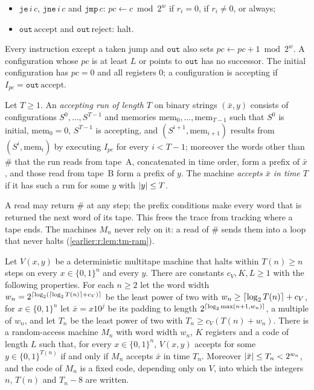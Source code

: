 \begin{definition}
\begin{itemize}
\item \(\mathtt{je}\,i\,c\), \(\mathtt{jne}\,i\,c\) and
\(\mathtt{jmp}\,c\): \(\mathit{pc}\leftarrow c\bmod2^w\) if \(r_i=0\),
if \(r_i\ne0\), or always;
\item \(\mathtt{out}\,\mathrm{accept}\) and
\(\mathtt{out}\,\mathrm{reject}\): halt.
\end{itemize}
Every instruction except a taken jump and \(\mathtt{out}\) also sets
\(\mathit{pc}\leftarrow\mathit{pc}+1\bmod2^w\). A configuration whose
\(\mathit{pc}\) is at least \(L\) or points to \(\mathtt{out}\) has no
successor. The initial configuration has \(\mathit{pc}=0\) and all
registers \(0\); a configuration is accepting if
\(I_{\mathit{pc}}=\mathtt{out}\,\mathrm{accept}\).

Let \(T\ge1\). An \emph{accepting run of length \(T\)} on binary
strings \((\bar x,y)\) consists of configurations
\(S^0,\ldots,S^{T-1}\) and memories
\(\mathrm{mem}_0,\ldots,\mathrm{mem}_{T-1}\) such that \(S^0\) is
initial, \(\mathrm{mem}_0=0\), \(S^{T-1}\) is accepting, and
\((S^{i+1},\mathrm{mem}_{i+1})\) results from \((S^i,\mathrm{mem}_i)\)
by executing \(I_{\mathit{pc}}\) for every \(i<T-1\); moreover the
words other than \(\#\) that the run reads from tape~A, concatenated in
time order, form a prefix of \(\bar x\), and those read from tape~B form
a prefix of \(y\). The machine \emph{accepts \(\bar x\) in time \(T\)}
if it has such a run for some \(y\) with \(\left|y\right|\le T\).
\end{definition}

A read may return \(\#\) at any step; the prefix conditions make every
word that is returned the next word of its tape. This frees the trace
from tracking where a tape ends. The machines \(M_n\) never rely on it:
a read of \(\#\) sends them into a loop that never halts
(\cref{earlier:r:lem:tm-ram}).

\begin{lemma}\label{earlier:r:lem:tm-ram}
Let \(V(x,y)\) be a deterministic multitape machine that halts within
\(T(n)\ge n\) steps on every \(x\in\{0,1\}^n\) and every \(y\). There are
constants \(c_V,K,L\ge1\) with the following properties. For each
\(n\ge2\) let the word width
\(w_n=2^{\left\lceil\log_2(\left\lceil\log_2 T(n)\right\rceil+c_V)\right\rceil}\) be the least power of two
with \(w_n\ge\left\lceil\log_2 T(n)\right\rceil+c_V\), for \(x\in\{0,1\}^n\) let
\(\bar x=x10^j\) be its padding to length
\(2^{\left\lceil\log_2\max(n+1,w_n)\right\rceil}\), a multiple of \(w_n\), and let \(T_n\)
be the least power of two with \(T_n\ge c_V(T(n)+w_n)\). There is a
random-access machine \(M_n\) with word width \(w_n\), \(K\) registers
and a code of length \(L\) such that, for every \(x\in\{0,1\}^n\),
\(V(x,y)\) accepts for some \(y\in\{0,1\}^{T(n)}\) if and only if
\(M_n\) accepts \(\bar x\) in time \(T_n\). Moreover
\(\left|\bar x\right|\le T_n<2^{w_n}\), and the code of \(M_n\) is a fixed
code, depending only on \(V\), into which the integers \(n\),
\(T(n)\) and \(T_n-8\) are written.
\end{lemma}

